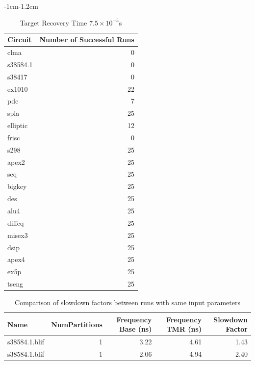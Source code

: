 \documentclass[12pt,final,oneside]{dwThesis} %
\begin{document}
      \begin{table}
      \footnotesize 
      \begin{adjustwidth}
         {-1cm}{-1.2cm}

         \begin{tabular}{lr}
            \toprule
 Circuit &  Number of Successful Runs\\
 \midrule
clma  & 0\\
s38584.1  & 0\\
s38417  & 0\\
ex1010  &  22\\
pdc   &  7\\
spla   &  25\\
elliptic &  12\\
frisc  & 0\\
s298  &   25\\
apex2  & 25\\
seq  &   25\\
bigkey  & 25\\
des  &   25\\
alu4  &   25\\
diffeq  & 25\\
misex3  & 25\\
dsip  &   25\\
apex4  & 25\\
ex5p  &   25\\
tseng  & 25\\
            \bottomrule 

         \end{tabular}
         \caption{Target Recovery Time $7.5\times10^{-5}$s} \label{partitionSuccesses} 
      \end{adjustwidth}

   \end{table}

   \begin{table}

      \begin{tabular}
         {lrrrr} \toprule Name & NumPartitions &
         Frequency Base (ns) & Frequency TMR (ns) & Slowdown Factor\\
         \midrule
         s38584.1.blif &	1 & 3.22 & 4.61 & 1.43\\
         s38584.1.blif &	1 & 2.06 &
         4.94 & 2.40\\
         \bottomrule 
      \end{tabular}
      \caption{Comparison of
         slowdown factors between runs with same input
         parameters}\label{tabStochastic} 
   \end{table}
\end{document}
